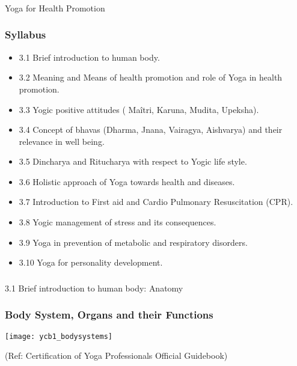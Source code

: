 \begin{frame}[fragile]\frametitle{}
\begin{center}
{\Large Yoga for Health Promotion }
\end{center}
\end{frame}


\begin{frame}[fragile]\frametitle{Syllabus}

\begin{itemize}
\item 3.1  Brief introduction to human body. 
\item 3.2  Meaning and Means of health promotion and role of Yoga  in health promotion. 
\item 3.3  Yogic positive attitudes ( Maîtri, Karuna, Mudita, Upeksha). 
\item 3.4  Concept of bhavas (Dharma, Jnana, Vairagya, Aishvarya) and their relevance in well being. 
\item 3.5  Dincharya and Ritucharya with respect to Yogic life style. 
\item 3.6  Holistic approach of Yoga towards health and diseases. 
\item 3.7  Introduction to First aid and Cardio Pulmonary Resuscitation (CPR). 
\item 3.8  Yogic management of stress and its consequences. 
\item 3.9  Yoga in prevention of metabolic and respiratory disorders. 
\item 3.10  Yoga for personality development. 
\end{itemize}
	  
\end{frame}

\begin{frame}[fragile]\frametitle{}
\begin{center}
{\Large 3.1  Brief introduction to human body: Anatomy}
\end{center}
\end{frame}

\begin{frame}[fragile]\frametitle{Body System, Organs and their Functions}

		\begin{center}
		\texttt{[image: ycb1\_bodysystems]} 
		
		{\tiny (Ref: Certification  of Yoga Professionals Official Guidebook)}
		\end{center}	

\end{frame}


